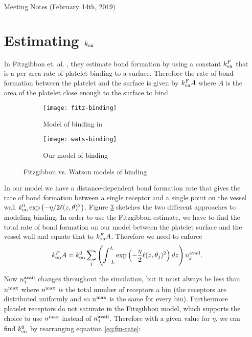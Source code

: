\documentclass{article}
\newcommand{\tn}{\textnormal}
\begin{document}
\pagestyle{empty}




\begin{center}
{\Large Meeting Notes (February 14th, 2019)}
\end{center}

\section{Estimating $k_\text{on}$}
\label{sec:estimating-onconst}

In Fitzgibbon et. al. \cite{Fitzgibbon2014}, they estimate bond
formation by using a constant $k_\tn{on}^F$ that is a per-area rate
of platelet binding to a surface. Therefore the rate of bond
formation between the platelet and the surface is given by
$k_\tn{on}^F A$ where $A$ is the area of the platelet close enough to
the surface to bind.

\begin{figure}
  \centering
  \begin{subfigure}{0.48\textwidth}
    \texttt{[image: fitz-binding]}
    \caption{Model of binding in \cite{Fitzgibbon2014}}
    \label{fig:fitz-binding}
  \end{subfigure}
  \hfill
  \begin{subfigure}{0.48\textwidth}
    \texttt{[image: wats-binding]}
    \caption{Our model of binding}
    \label{fig:wats-binding}
  \end{subfigure}
  \caption{Fitzgibbon vs. Watson models of binding}
  \label{fig:binding}
\end{figure}

In our model we have a distance-dependent bond formation rate that
gives the rate of bond formation between a single receptor and a
single point on the vessel wall $k_\tn{on}^0 \exp \left(-\eta/2
  \ell(z, \theta)^2 \right)$. Figure \ref{fig:binding} sketches the
two different approaches to modeling binding. In order to use the
Fitzgibbon estimate, we have to find the total rate of bond formation
on our model between the platelet surface and the vessel wall and
equate that to $k_\tn{on}^F A$. Therefore we need to enforce
\begin{equation}
  \label{eq:fm-rate}
  k_\tn{on}^F A = k_\tn{on}^0 \sum_j \left( \int_{-L}^{L} \exp
    \left(-\frac{\eta}{2} \ell(z, \theta_j)^2\right) dz \right)
  n_j^\tn{avail}.
\end{equation}

Now $n_j^\tn{avail}$ changes throughout the simulation, but it must
always be less than $n^\tn{max}$ where $n^\tn{max}$ is the total
number of receptors a bin (the receptors are distributed uniformly and
so $n^\tn{max}$ is the same for every bin). Furthermore platelet
receptors do not saturate in the Fitzgibbon model, which supports the
choice to use $n^\tn{max}$ instead of $n_j^\tn{avail}$. Therefore with
a given value for $\eta$, we can find $k_\tn{on}^0$ by rearranging
equation \eqref{eq:fm-rate}:
\end{document}
